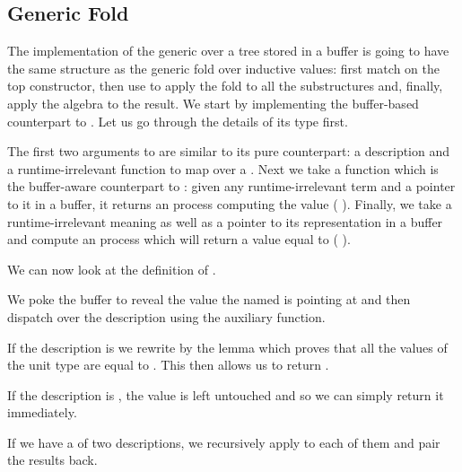 
\subsection{Generic Fold}

The implementation of the generic  over a tree stored
in a buffer is going to have the same structure as the generic fold over
inductive values: first match on the top constructor, then use 
to apply the fold to all the substructures and, finally, apply the algebra to
the result.
%
We start by implementing the buffer-based counterpart to .
Let us go through the details of its type first.


The first two arguments to  are similar to its pure
counterpart: a description  and a runtime-irrelevant function
 to map over a .
%
Next we take a function which is the buffer-aware counterpart to :
given any runtime-irrelevant term  and a pointer to it in a buffer,
it returns an  process computing the value ( ).
%
Finally, we take a runtime-irrelevant meaning 
as well as a pointer to its representation in a buffer and compute
an  process which will return a value equal to
(   ).

We can now look at the definition of .


We poke the buffer to reveal the value the 
named  is pointing at and then dispatch over the description
 using the  auxiliary function.

If the description is  we rewrite by the lemma
 which proves that all the values of the unit type
are equal to \IdrisData{()}. This then allows us to return \IdrisData{()}.

If the description is , the value is left untouched and so
we can simply return it immediately.

If we have a  of two descriptions, we recursively apply
 to each of them and pair the results back.

